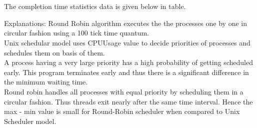 \documentclass{article}
\begin{document}
\section*{}
The completion time statistics data is given below in table.

Explanations:
Round Robin algorithm executes the the processes one by one in circular fashion using a 100 tick time quantum.
\\
Unix schedular model uses CPUUsage value to decide priorities of processes and schedules them on basis of them.
\\
A process having a very large priority has a high probability of getting scheduled early. This program terminates early and thus there is a significant difference
in the minimum waiting time.
\\
Round robin handles all processes with equal priority by scheduling them in a circular fashion. Thus threads exit nearly after the same time interval. Hence the max - min value is small for
Round-Robin scheduler when compared to Unix Scheduler model.

	
\end{document}

